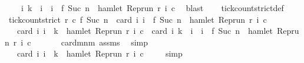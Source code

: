 \begin{isabellebody}
\isanewline
\ \ \ \ {\isacharasterisk}{\isacharcolon}{\isacartoucheopen}{\isasymforall}i{\isachardot}\ k\ {\isasymle}\ i\ {\isasymand}\ i\ {\isacharless}\ f\ {\isacharparenleft}Suc\ n{\isacharparenright}\ {\isasymlongrightarrow}\ {\isasymnot}hamlet\ {\isacharparenleft}{\isacharparenleft}Rep{\isacharunderscore}run\ r{\isacharparenright}\ i\ c{\isacharparenright}{\isacartoucheclose}\ \isamarkupfalse%
\ blast\isanewline
\ \ \isamarkupfalse%
\ tick{\isacharunderscore}count{\isacharunderscore}strict{\isacharunderscore}def\ \isamarkupfalse%
\ {\isacartoucheopen}tick{\isacharunderscore}count{\isacharunderscore}strict\ r\ c\ {\isacharparenleft}f\ {\isacharparenleft}Suc\ n{\isacharparenright}{\isacharparenright}\ {\isacharequal}\ card\ {\isacharbraceleft}i{\isachardot}\ i\ {\isacharless}\ f\ {\isacharparenleft}Suc\ n{\isacharparenright}\ {\isasymand}\ hamlet\ {\isacharparenleft}{\isacharparenleft}Rep{\isacharunderscore}run\ r{\isacharparenright}\ i\ c{\isacharparenright}{\isacharbraceright}{\isacartoucheclose}\ \isacommand{{\isachardot}}\isamarkupfalse%
\isanewline
\ \ \isamarkupfalse%
\ \isamarkupfalse%
\ {\isacartoucheopen}{\isachardot}{\isachardot}{\isachardot}\ {\isacharequal}\ card\ {\isacharbraceleft}i{\isachardot}\ i\ {\isacharless}\ k\ {\isasymand}\ hamlet\ {\isacharparenleft}{\isacharparenleft}Rep{\isacharunderscore}run\ r{\isacharparenright}\ i\ c{\isacharparenright}{\isacharbraceright}\ {\isacharplus}\ card\ {\isacharbraceleft}i{\isachardot}\ k\ {\isasymle}\ i\ {\isasymand}\ i\ {\isacharless}\ f\ {\isacharparenleft}Suc\ n{\isacharparenright}\ {\isasymand}\ hamlet\ {\isacharparenleft}{\isacharparenleft}Rep{\isacharunderscore}run\ r{\isacharparenright}\ i\ c{\isacharparenright}{\isacharbraceright}{\isacartoucheclose}\ \isanewline
\ \ \ \ \isamarkupfalse%
\ card{\isacharunderscore}mnm{\isacharprime}\ assms{\isacharparenleft}{}{\isacharparenright}\ \isamarkupfalse%
\ simp\isanewline
\ \ \isamarkupfalse%
\ \isamarkupfalse%
\ {\isacartoucheopen}{\isachardot}{\isachardot}{\isachardot}\ {\isacharequal}\ card\ {\isacharbraceleft}i{\isachardot}\ i\ {\isacharless}\ k\ {\isasymand}\ hamlet\ {\isacharparenleft}{\isacharparenleft}Rep{\isacharunderscore}run\ r{\isacharparenright}\ i\ c{\isacharparenright}{\isacharbraceright}{\isacartoucheclose}\ \isamarkupfalse%
\ {\isacharasterisk}\ \isamarkupfalse%
\ simp\isanewline
\ \ \isamarkupfalse%
\ \isamarkupfalse%

\end{isabellebody}
